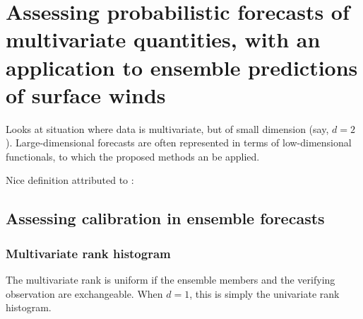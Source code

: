 \documentclass[10pt,fleqn]{article}
\begin{document}
\section{Assessing probabilistic forecasts of multivariate quantities, with an application to ensemble predictions of surface winds \cite{Gneiting2008}}


Looks at situation where data is multivariate, but of small dimension (say, $d=2$). Large-dimensional forecasts are often represented in terms of low-dimensional functionals, to which the proposed methods an be applied.

Nice definition attributed to \cite{Gneiting2007}: 

\subsection{Assessing calibration in ensemble forecasts}

\subsubsection*{Multivariate rank histogram}

The multivariate rank is uniform if the ensemble members and the verifying observation are exchangeable. When $d=1$, this is simply the univariate rank histogram.
\end{document}
